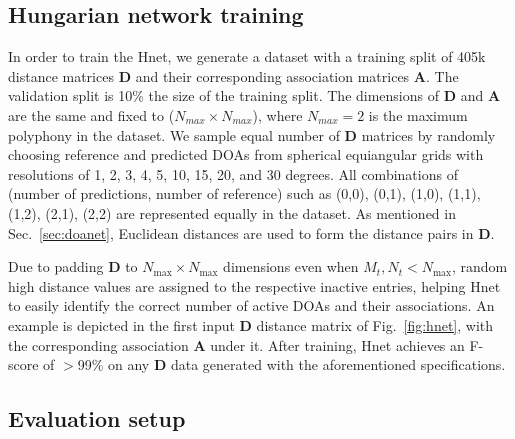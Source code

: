 \documentclass[conference]{IEEEtran}
\def\D {\mathbf{D}}
\def\A {\mathbf{A}}
\begin{document}
\subsection{Hungarian network training}
\label{sec:training}

In order to train the Hnet, we generate a dataset with a training split of 405k distance matrices $\D$ and their corresponding association matrices $\A$. The validation split is 10\% the size of the training split. The dimensions of $\D$ and $\A$ are the same and fixed to ($N_{max} \times N_{max}$), where $N_{max} = 2$ is the maximum polyphony in the dataset.
We sample equal number of $\D$ matrices by randomly choosing reference and predicted DOAs from spherical equiangular grids with resolutions of 1, 2, 3, 4, 5, 10, 15, 20, and 30 degrees.
All combinations of (number of predictions, number of reference) such as {(0,0), (0,1), (1,0), (1,1), (1,2), (2,1), (2,2)} are represented equally in the dataset. As mentioned in Sec.~\ref{sec:doanet}, Euclidean distances are used to form the distance pairs in $\mathbf{D}$.

Due to padding $\D$ to $N_\mathrm{max}\times N_\mathrm{max}$ dimensions even when $M_t,N_t<N_\mathrm{max}$, random high distance values are assigned to the respective inactive entries, helping Hnet to easily identify the correct number of active DOAs and their associations. An example is depicted in the first input $\mathbf{D}$ distance matrix of Fig.~\ref{fig:hnet}, with the corresponding association $\A$ under it. After training, Hnet achieves an F-score of $>$99\% on any $\mathbf{D}$ data generated with the aforementioned specifications.

\subsection{Evaluation setup}
\label{sec:dataset}
\end{document}
